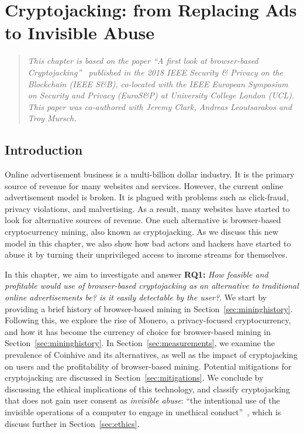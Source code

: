 

\chapter{Cryptojacking: from Replacing Ads to Invisible Abuse}\label{sec:cryptojacking}

\begin{quote}
	\textit{This chapter is based on the paper ``A first look at browser-based Cryptojacking''~\cite{eskandari2018first} published in the 2018 IEEE Security \& Privacy on the Blockchain (IEEE S\&B), co-located with the IEEE European Symposium on Security and Privacy (\textit{EuroS\&P}) at University College London (UCL). This paper was co-authored with Jeremy Clark, Andreas Leoutsarakos and Troy Mursch.}
\end{quote}


\section{Introduction}

Online advertisement business is a multi-billion dollar industry. It is the primary source of revenue for many websites and services. However, the current online advertisement model is broken. It is plagued with problems such as click-fraud, privacy violations, and malvertising. As a result, many websites have started to look for alternative sources of revenue. One such alternative is browser-based cryptocurrency mining, also known as cryptojacking. As we discuss this new model in this chapter, we also show how bad actors and hackers have started to abuse it by turning their unprivileged access to income streams for themselves.

In this chapter, we aim to investigate and answer \textbf{RQ1:} \textit{How feasible and profitable would use of browser-based cryptojacking as an alternative to traditional online advertisements be? is it easily detectable by the user?}. We start by providing a brief history of browser-based mining in Section~\ref{sec:mininghistory}. Following this, we explore the rise of Monero, a privacy-focused cryptocurrency, and how it has become the currency of choice for browser-based mining in Section~\ref{sec:mininghistory}. In Section~\ref{sec:measurements}, we examine the prevalence of Coinhive and its alternatives, as well as the impact of cryptojacking on users and the profitability of browser-based mining. Potential mitigations for cryptojacking are discussed in Section~\ref{sec:mitigations}. We conclude by discussing the ethical implications of this technology, and classify cryptojacking that does not gain user consent as \textit{invisible abuse}: ``the intentional use of the invisible operations of a computer to engage in unethical conduct''~\cite{moor1985computer}, which is discuss further in Section~\ref{sec:ethics}.

